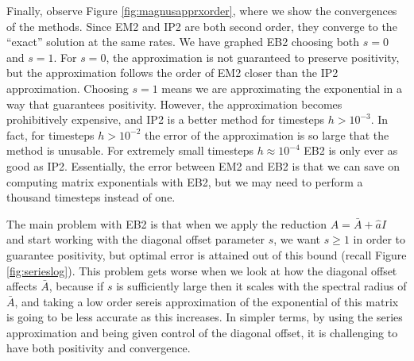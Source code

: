 Finally, observe Figure \ref{fig:magnusapprxorder}, where we show the convergences of the methods.
Since EM2 and IP2 are both second order, they converge to the ``exact'' solution at the same rates.
We have graphed EB2 choosing both $s=0$ and $s=1$. For $s=0$, the approximation is not guaranteed to preserve positivity,
but the approximation follows the order of EM2 closer than the IP2 approximation.
Choosing $s=1$ means we are approximating the exponential in a way that guarantees positivity.
However, the approximation becomes prohibitively expensive, and IP2 is a better method for timesteps $h > 10^{-3}$.
In fact, for timesteps $h > 10^{-2}$ the error of the approximation is so large that the method is unusable. 
For extremely small timesteps $h \approx 10^{-4}$ EB2 is only ever as good as IP2.
Essentially, the error between EM2 and EB2 is that we can save on computing matrix exponentials with EB2,
but we may need to perform a thousand timesteps instead of one.

The main problem with EB2 is that when we apply the reduction $A = \bar{A} + \hat{a}I$ and start working with the diagonal offset parameter $s$,
we want $s \ge 1$ in order to guarantee positivity, but optimal error is attained out of this bound (recall Figure \ref{fig:serieslog}).
This problem gets worse when we look at how the diagonal offset affects $\bar{A}$, because if $s$ is sufficiently large then it scales with the spectral radius of $\bar{A}$,
and taking a low order sereis approximation of the exponential of this matrix is going to be less accurate as this increases.
In simpler terms, by using the series approximation and being given control of the diagonal offset, it is challenging to have both positivity and convergence.



